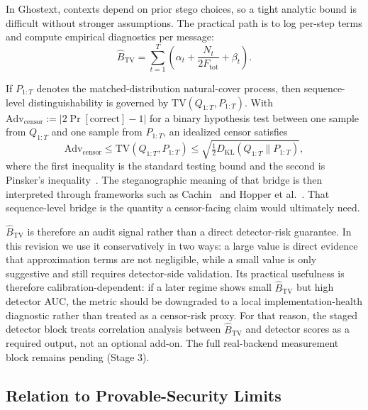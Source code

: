 In Ghostext, contexts depend on prior stego choices, so a tight analytic bound is difficult without stronger assumptions. The practical path is to log per-step terms and compute empirical diagnostics per message:
\begin{equation}
\widehat{B}_{\mathrm{TV}}=\sum_{t=1}^{T}\left(\alpha_t + \frac{N_t}{2F_{\mathrm{tot}}} + \beta_t\right).
\label{eq:bhat-tv}
\end{equation}

If $P_{1:T}$ denotes the matched-distribution natural-cover process, then sequence-level distinguishability is governed by $\mathrm{TV}(Q_{1:T},P_{1:T})$. With $\mathrm{Adv}_{\mathrm{censor}} := |2\Pr[\mathrm{correct}] - 1|$ for a binary hypothesis test between one sample from $Q_{1:T}$ and one sample from $P_{1:T}$, an idealized censor satisfies
\begin{equation}
\mathrm{Adv}_{\mathrm{censor}}\le \mathrm{TV}(Q_{1:T},P_{1:T}) \le \sqrt{\tfrac{1}{2}D_{\mathrm{KL}}(Q_{1:T}\|P_{1:T})},
\end{equation}
where the first inequality is the standard testing bound and the second is Pinsker's inequality~\cite{tsybakov2009introduction}. The steganographic meaning of that bridge is then interpreted through frameworks such as Cachin~\cite{cachin1998information} and Hopper et al.~\cite{hopper2002provably}. That sequence-level bridge is the quantity a censor-facing claim would ultimately need.

$\widehat{B}_{\mathrm{TV}}$ is therefore an audit signal rather than a direct detector-risk guarantee. In this revision we use it conservatively in two ways: a large value is direct evidence that approximation terms are not negligible, while a small value is only suggestive and still requires detector-side validation. Its practical usefulness is therefore calibration-dependent: if a later regime shows small $\widehat{B}_{\mathrm{TV}}$ but high detector AUC, the metric should be downgraded to a local implementation-health diagnostic rather than treated as a censor-risk proxy. For that reason, the staged detector block treats correlation analysis between $\widehat{B}_{\mathrm{TV}}$ and detector scores as a required output, not an optional add-on. The full real-backend measurement block remains pending (Stage 3).

\subsection{Relation to Provable-Security Limits}

